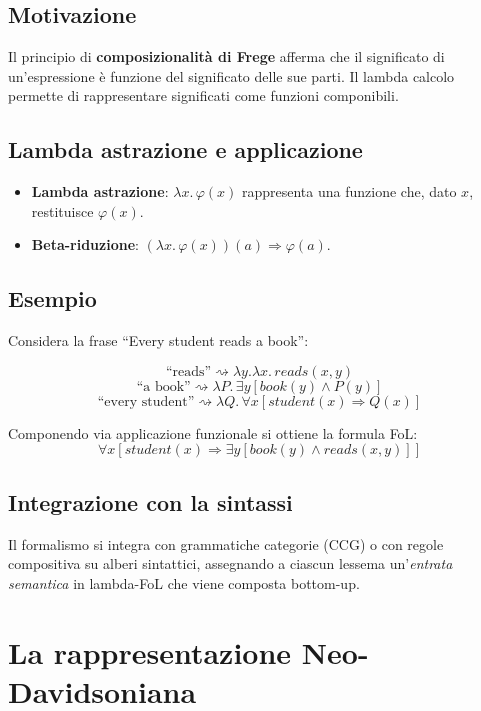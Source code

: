\documentclass[12pt,a4paper]{article}
\begin{document}
\subsection{Motivazione}
Il principio di \textbf{composizionalità di Frege} afferma che il significato di un'espressione è funzione del significato delle sue parti. Il lambda calcolo permette di rappresentare significati come funzioni componibili.

\subsection{Lambda astrazione e applicazione}
\begin{defbox}
\begin{itemize}[leftmargin=1.5em]
  \item \textbf{Lambda astrazione}: $\lambda x.\, \varphi(x)$ rappresenta una funzione che, dato $x$, restituisce $\varphi(x)$.
  \item \textbf{Beta-riduzione}: $(\lambda x.\, \varphi(x))(a) \Rightarrow \varphi(a)$.
\end{itemize}
\end{defbox}

\subsection{Esempio}
Considera la frase ``Every student reads a book'':
\begin{formulabox}
\[
\text{``reads''} \rightsquigarrow \lambda y.\lambda x.\, \mathit{reads}(x,y)
\]
\[
\text{``a book''} \rightsquigarrow \lambda P.\, \exists y[\mathit{book}(y) \wedge P(y)]
\]
\[
\text{``every student''} \rightsquigarrow \lambda Q.\, \forall x[\mathit{student}(x) \Rightarrow Q(x)]
\]
\end{formulabox}
Componendo via applicazione funzionale si ottiene la formula FoL:
\[
\forall x[\mathit{student}(x) \Rightarrow \exists y[\mathit{book}(y) \wedge \mathit{reads}(x,y)]]
\]

\subsection{Integrazione con la sintassi}
Il formalismo si integra con grammatiche categorie (CCG) o con regole compositiva su alberi sintattici, assegnando a ciascun lessema un'\emph{entrata semantica} in lambda-FoL che viene composta bottom-up.

\section{La rappresentazione Neo-Davidsoniana}
\end{document}
